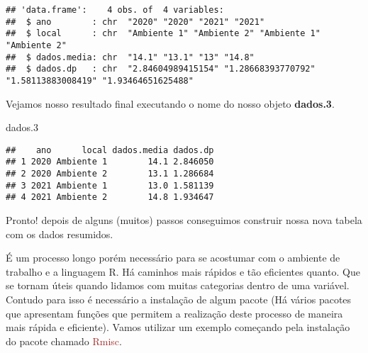 \documentclass[14pt,titlepage, oneside, openany, a4paper]{book}
\newenvironment{Shaded}{\begin{snugshade}}{\end{snugshade}}
\newcommand{\FloatTok}[1]{\textcolor[rgb]{0.00,0.00,0.81}{#1}}
\newcommand{\KeywordTok}[1]{\textcolor[rgb]{0.13,0.29,0.53}{\textbf{#1}}}
\newcommand{\NormalTok}[1]{#1}
\newcommand{\OperatorTok}[1]{\textcolor[rgb]{0.81,0.36,0.00}{\textbf{#1}}}
\newcommand{\StringTok}[1]{\textcolor[rgb]{0.31,0.60,0.02}{#1}}
\begin{document}
\begin{verbatim}
## 'data.frame':    4 obs. of  4 variables:
##  $ ano        : chr  "2020" "2020" "2021" "2021"
##  $ local      : chr  "Ambiente 1" "Ambiente 2" "Ambiente 1" "Ambiente 2"
##  $ dados.media: chr  "14.1" "13.1" "13" "14.8"
##  $ dados.dp   : chr  "2.84604989415154" "1.28668393770792" "1.58113883008419" "1.93464651625488"
\end{verbatim}

\begin{Shaded}
\end{Shaded}

Vejamos nosso resultado final executando o nome do nosso objeto \textbf{dados.3}.

\begin{Shaded}
\begin{Highlighting}[]
\NormalTok{dados}\FloatTok{.3}
\end{Highlighting}
\end{Shaded}

\begin{verbatim}
##    ano      local dados.media dados.dp
## 1 2020 Ambiente 1        14.1 2.846050
## 2 2020 Ambiente 2        13.1 1.286684
## 3 2021 Ambiente 1        13.0 1.581139
## 4 2021 Ambiente 2        14.8 1.934647
\end{verbatim}

Pronto! depois de alguns (muitos) passos conseguimos construir nossa nova tabela com os dados resumidos.

É um processo longo porém necessário para se acostumar com o ambiente de trabalho e a linguagem R. Há caminhos mais rápidos e tão eficientes quanto. Que se tornam úteis quando lidamos com muitas categorias dentro de uma variável. Contudo para isso é necessário a instalação de algum pacote (Há vários pacotes que apresentam funções que permitem a realização deste processo de maneira mais rápida e eficiente). Vamos utilizar um exemplo começando pela instalação do pacote chamado \textcolor{brown}{Rmisc}.
\end{document}
